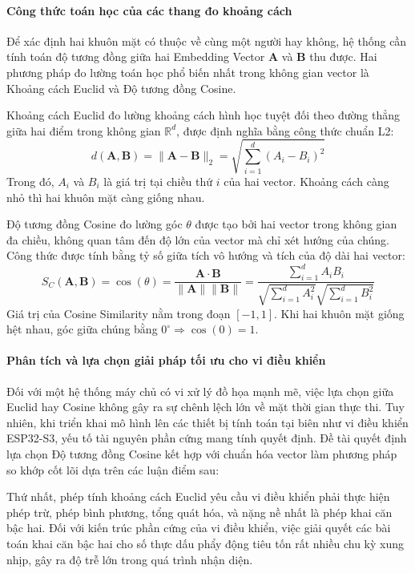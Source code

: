\paragraph{Công thức toán học của các thang đo khoảng cách}
Để xác định hai khuôn mặt có thuộc về cùng một người hay không, hệ thống cần tính toán độ tương đồng giữa hai Embedding Vector $\mathbf{A}$ và $\mathbf{B}$ thu được. Hai phương pháp đo lường toán học phổ biến nhất trong không gian vector là Khoảng cách Euclid và Độ tương đồng Cosine.

Khoảng cách Euclid đo lường khoảng cách hình học tuyệt đối theo đường thẳng giữa hai điểm trong không gian $\mathbb{R}^d$, được định nghĩa bằng công thức chuẩn L2:
$$
d(\mathbf{A}, \mathbf{B}) = \|\mathbf{A} - \mathbf{B}\|_2 = \sqrt{\sum_{i=1}^{d} (A_i - B_i)^2}
$$
Trong đó, $A_i$ và $B_i$ là giá trị tại chiều thứ $i$ của hai vector. Khoảng cách càng nhỏ thì hai khuôn mặt càng giống nhau.

Độ tương đồng Cosine đo lường góc $\theta$ được tạo bởi hai vector trong không gian đa chiều, không quan tâm đến độ lớn của vector mà chỉ xét hướng của chúng. Công thức được tính bằng tỷ số giữa tích vô hướng và tích của độ dài hai vector:
$$
S_C(\mathbf{A}, \mathbf{B}) = \cos(\theta) = \frac{\mathbf{A} \cdot \mathbf{B}}{\|\mathbf{A}\| \|\mathbf{B}\|} = \frac{\sum_{i=1}^{d} A_i B_i}{\sqrt{\sum_{i=1}^{d} A_i^2} \sqrt{\sum_{i=1}^{d} B_i^2}}
$$
Giá trị của Cosine Similarity nằm trong đoạn $[-1, 1]$. Khi hai khuôn mặt giống hệt nhau, góc giữa chúng bằng $0^\circ \Rightarrow \cos(0) = 1$.

\paragraph{Phân tích và lựa chọn giải pháp tối ưu cho vi điều khiển}
Đối với một hệ thống máy chủ có vi xử lý đồ họa mạnh mẽ, việc lựa chọn giữa Euclid hay Cosine không gây ra sự chênh lệch lớn về mặt thời gian thực thi. Tuy nhiên, khi triển khai mô hình lên các thiết bị tính toán tại biên như vi điều khiển ESP32-S3, yếu tố tài nguyên phần cứng mang tính quyết định. Đề tài quyết định lựa chọn Độ tương đồng Cosine kết hợp với chuẩn hóa vector làm phương pháp so khớp cốt lõi dựa trên các luận điểm sau:

Thứ nhất, phép tính khoảng cách Euclid yêu cầu vi điều khiển phải thực hiện phép trừ, phép bình phương, tổng quát hóa, và nặng nề nhất là phép khai căn bậc hai. Đối với kiến trúc phần cứng của vi điều khiển, việc giải quyết các bài toán khai căn bậc hai cho số thực dấu phẩy động tiêu tốn rất nhiều chu kỳ xung nhịp, gây ra độ trễ lớn trong quá trình nhận diện.

